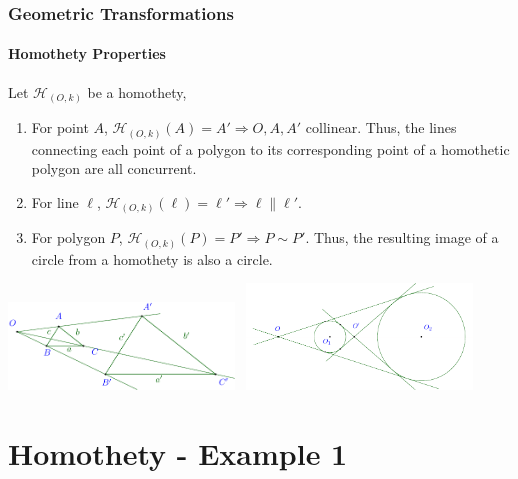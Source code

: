 \documentclass[8pt,xcolor=table,dvipsnames]{beamer}
\begin{document}
\begin{frame}[t]
    \frametitle{Geometric Transformations}
    \framesubtitle{Homothety Properties}
    \begin{theorem}
        Let $\mathcal{H}_{(O, k)}$ be a homothety,
        \begin{enumerate}
            \item For point $A$, $\mathcal{H}_{(O, k)}(A) = A' \Rightarrow O,A,A'$ collinear.
            Thus, the lines connecting each point of a polygon  to its corresponding point of a homothetic polygon
            are all concurrent.
            \item For line $\ell$, $\mathcal{H}_{(O, k)}(\ell) = \ell' \Rightarrow \ell \parallel \ell'.$
            \item For polygon $P$, $\mathcal{H}_{(O, k)}(P) = P' \Rightarrow P \sim P'.$
            Thus, the resulting image of a circle from a homothety is also a circle.
        \end{enumerate}
    \end{theorem}

    \begin{center}
        \includegraphics[width=6cm]{./svg/pdf/homothety-1.pdf}
        \
        \includegraphics[width=6cm]{./svg/pdf/homothety-2.pdf}
    \end{center}
\end{frame}

\section{Homothety - Example 1}
\end{document}
